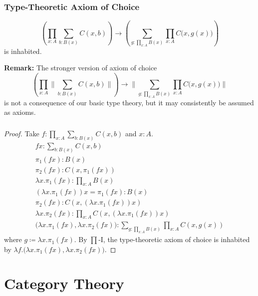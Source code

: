 \documentclass[UTF8,11pt,colorlinks,compress,openany]{beamer}%
\begin{document}
\begin{frame}\frametitle{Type-Theoretic Axiom of Choice}
\begin{theorem}
\[\left(\prod_{x:A}\sum_{b:B(x)}C(x,b)\right)\to\left(\sum_{g:\prod_{x:A}B(x)}\prod_{x:A}C\big(x,g(x)\big)\right)\]
is inhabited.
\end{theorem}
\textbf{Remark:} The stronger version of axiom of choice
\[\left(\prod_{x:A}\bigg\|\sum_{b:B(x)}C(x,b)\bigg\|\right)\to\bigg\|\sum_{g:\prod_{x:A}B(x)}\prod_{x:A}C\big(x,g(x)\big)\bigg\|\]
is not a consequence of our basic type theory, but it may consistently be assumed as axioms.
\end{frame}

\begin{frame}\frametitle{}
\begin{proof}
Take $f:\prod_{x:A}\sum_{b:B(x)}C(x,b)$ and $x:A$.
\begin{gather*}
fx:\sum_{b:B(x)}C(x,b) \tag{$\prod$-E}\\
\pi_1(fx):B(x) \tag{$\sum$-$E_1$}\\
\pi_2(fx):C(x,\pi_1(fx)) \tag{$\sum$-$E_2$}\\
\lambda x.\pi_1(fx):\prod_{x:A}B(x) \tag{$\prod$-I}\\
(\lambda x.\pi_1(fx))x=\pi_1(fx):B(x) \tag{$\prod$-C}\\
\pi_2(fx):C(x,(\lambda x.\pi_1(fx))x) \tag{substitution}\\
\lambda x.\pi_2(fx):\prod_{x:A}C(x,(\lambda x.\pi_1(fx))x) \tag{$\prod$-I}\\
\big(\lambda x.\pi_1(fx),\lambda x.\pi_2(fx)\big):\sum_{g:\prod_{x:A}B(x)}\prod_{x:A}C(x,g(x)) \tag{$\sum$-I}
\end{gather*}
where $g\coloneqq\lambda x.\pi_1(fx)$. By $\prod$-I, the type-theoretic axiom of choice is inhabited by $\lambda f.\big(\lambda x.\pi_1(fx),\lambda x.\pi_2(fx)\big)$.
\end{proof}
\end{frame}


\section{Category Theory}
\end{document}
